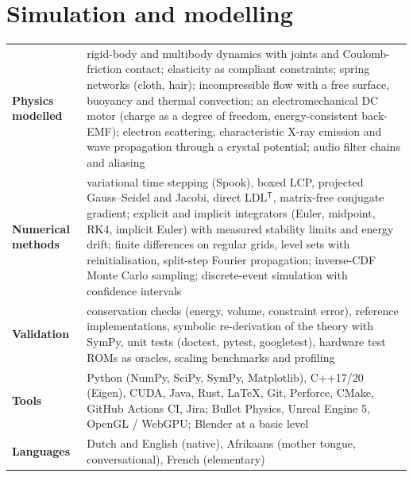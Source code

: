 \documentclass[10pt,a4paper]{article}
\begin{document}
\section{Simulation and modelling}
\begin{tabularx}{\textwidth}{@{}p{3.1cm}X@{}}
\textbf{Physics modelled} & rigid-body and multibody dynamics with joints and Coulomb-friction contact; elasticity as compliant constraints; spring networks (cloth, hair); incompressible flow with a free surface, buoyancy and thermal convection; an electromechanical DC motor (charge as a degree of freedom, energy-consistent back-EMF); electron scattering, characteristic X-ray emission and wave propagation through a crystal potential; audio filter chains and aliasing \\
\textbf{Numerical methods} & variational time stepping (Spook), boxed LCP, projected Gauss--Seidel and Jacobi, direct LDL$^{\mathsf T}$, matrix-free conjugate gradient; explicit and implicit integrators (Euler, midpoint, RK4, implicit Euler) with measured stability limits and energy drift; finite differences on regular grids, level sets with reinitialisation, split-step Fourier propagation; inverse-CDF Monte Carlo sampling; discrete-event simulation with confidence intervals \\
\textbf{Validation} & conservation checks (energy, volume, constraint error), reference implementations, symbolic re-derivation of the theory with SymPy, unit tests (doctest, pytest, googletest), hardware test ROMs as oracles, scaling benchmarks and profiling \\
\textbf{Tools} & Python (NumPy, SciPy, SymPy, Matplotlib), C++17/20 (Eigen), CUDA, Java, Rust, \LaTeX, Git, Perforce, CMake, GitHub Actions CI, Jira; Bullet Physics, Unreal Engine 5, OpenGL / WebGPU; Blender at a basic level \\
\textbf{Languages} & Dutch and English (native), Afrikaans (mother tongue, conversational), French (elementary)
\end{tabularx}

\end{document}
